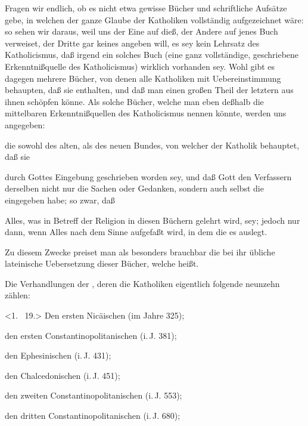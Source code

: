\begin{aufza}
\item Fragen wir endlich, ob es nicht etwa gewisse Bücher und schriftliche Aufsätze gebe, in welchen der ganze Glaube der Katholiken vollständig aufgezeichnet wäre: so sehen wir daraus, weil uns der Eine auf dieß, der Andere auf jenes Buch verweiset, der Dritte gar keines angeben will, es sey kein Lehrsatz des Katholicismus, daß irgend ein solches Buch (eine ganz vollständige, geschriebene Erkenntnißquelle des Katholicismus) wirklich vorhanden sey. Wohl gibt es dagegen mehrere Bücher, von denen alle Katholiken mit Uebereinstimmung behaupten, daß sie  enthalten, und daß man einen großen Theil der letztern aus ihnen schöpfen könne. Als solche Bücher, welche man eben deßhalb die mittelbaren Erkenntnißquellen des Katholicismus nennen könnte, werden uns angegeben:
\begin{aufzb}
\item die  sowohl des alten, als des neuen Bundes, von welcher der Katholik behauptet, daß sie
\begin{aufzc}
\item durch Gottes Eingebung geschrieben worden sey, und daß Gott den Verfassern derselben nicht nur die Sachen oder Gedanken, sondern auch selbst die  eingegeben habe; so zwar, daß
\item Alles, was in Betreff der Religion in diesen Büchern gelehrt wird,  sey; jedoch nur dann, wenn Alles nach dem Sinne aufgefaßt wird, in dem die  es auslegt.
\item Zu diesem Zwecke preiset man als besonders brauchbar die bei ihr übliche lateinische Uebersetzung dieser Bücher, welche  heißt.
\end{aufzc}
\item Die Verhandlungen der , deren die Katholiken eigentlich folgende neunzehn zählen:
\begin{leercompactenum}
\item{}<1. \auslass\ 19.> Den ersten Nicäischen (im Jahre 325);
\item den ersten Constantinopolitanischen (i.\,J. 381);
\item den Ephesinischen (i.\,J. 431);
\item den Chalcedonischen (i.\,J. 451);
\item den zweiten Constantinopolitanischen (i.\,J. 553);
\item den dritten Constantinopolitanischen (i.\,J. 680);

\end{leercompactenum}
\end{aufzb}
\end{aufza}

